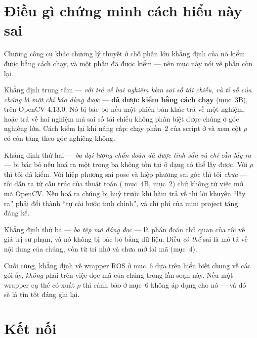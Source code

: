\documentclass[../../marker.tex]{subfiles}
\begin{document}
\begin{dongian}
\end{dongian}

\section{Điều gì chứng minh cách hiểu này sai}

Chương công cụ khác chương lý thuyết ở chỗ phần lớn khẳng định của nó kiểm được
bằng cách chạy, và một phần đã được kiểm --- nên mục này nói về phần còn lại.

Khẳng định trung tâm --- \emph{ với  trả
về hai nghiệm kèm sai số tái chiếu, và tỉ số của chúng là một chỉ báo dùng được}
--- \textbf{đã được kiểm bằng cách chạy} (mục~3B), trên OpenCV 4.13.0. Nó bị bác
bỏ nếu một phiên bản khác trả về một nghiệm, hoặc trả về hai nghiệm mà sai số tái
chiếu không phân biệt được chúng ở góc nghiêng lớn. Cách kiểm lại khi nâng cấp:
chạy phần~2 của script ở  và xem cột \(\rho\) có còn tăng theo góc
nghiêng không.

Khẳng định thứ hai --- \emph{ba đại lượng chẩn đoán đã được tính sẵn và chỉ cần
lấy ra} --- bị bác bỏ nếu hoá ra một trong ba không tồn tại ở dạng có thể lấy
được. Với \(\rho\) thì tôi đã kiểm. Với hiệp phương sai pose và hiệp phương sai
góc thì tôi \emph{chưa} --- tôi dẫn ra từ cấu trúc của thuật toán (
mục~4B,  mục~2) chứ không từ việc mở mã OpenCV. Nếu hoá ra chúng bị
huỷ trước khi hàm trả về thì lời khuyên ``lấy ra'' phải đổi thành ``tự cài bước
tinh chỉnh'', và chi phí của mini project tăng đáng kể.

Khẳng định thứ ba --- \emph{ba tệp mã đáng đọc} --- là phán đoán chủ quan của tôi
về giá trị sư phạm, và nó không bị bác bỏ bằng dữ liệu. Điều \emph{có thể} sai là
mô tả về nội dung của chúng, vốn từ trí nhớ và chưa mở lại mã (mục~4).

Cuối cùng, khẳng định về wrapper ROS ở mục~6 dựa trên hiểu biết chung về các gói
ấy, \emph{không} phải trên việc đọc mã của chúng trong lần soạn này. Nếu một
wrapper cụ thể có xuất \(\rho\) thì cảnh báo ở mục~6 không áp dụng cho nó --- và
đó sẽ là tin tốt đáng ghi lại.

\section{Kết nối}
\end{document}
